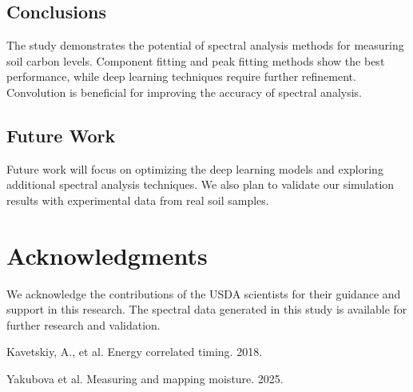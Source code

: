 \documentclass[review]{elsarticle}
\begin{document}
\subsection{Conclusions}

The study demonstrates the potential of spectral analysis methods for measuring soil carbon levels. Component fitting and peak fitting methods show the best performance, while deep learning techniques require further refinement. Convolution is beneficial for improving the accuracy of spectral analysis.

\subsection{Future Work}

Future work will focus on optimizing the deep learning models and exploring additional spectral analysis techniques. We also plan to validate our simulation results with experimental data from real soil samples.

\section{Acknowledgments}

We acknowledge the contributions of the USDA scientists for their guidance and support in this research. The spectral data generated in this study is available for further research and validation.



 



\begin{thebibliography}{00}

Kavetskiy, A., et al. Energy correlated timing. 2018.

Yakubova et al. Measuring and mapping moisture. 2025.


\end{thebibliography}
\end{document}
